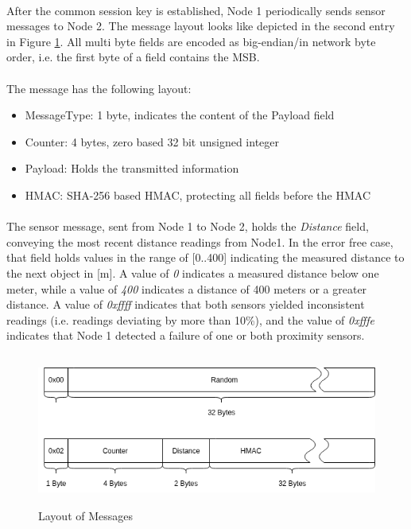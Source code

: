 \paragraph{} After the common session key is established, Node 1 periodically sends sensor messages to Node 2. The message layout looks like depicted in the second entry in Figure \ref{fig:msg}. All multi byte fields are encoded as big-endian/in network byte order, i.e. the first byte of a field contains the MSB.

\paragraph{} The message has the following layout:
\begin{itemize}
	\item MessageType: 1 byte, indicates the content of the Payload field
	\item Counter: 4 bytes, zero based 32 bit unsigned integer
	\item Payload: Holds the transmitted information
	\item HMAC: SHA-256 based HMAC, protecting all fields before the HMAC
\end{itemize}

\paragraph{} The sensor message, sent from Node 1 to Node 2, holds the \emph{Distance} field, conveying the most recent distance readings from Node1. In the error free case, that field holds values in the range of [0..400] indicating the measured distance to the next object in [m]. A value of \emph{0} indicates a measured distance below one meter, while a value of \emph{400} indicates a distance of 400 meters or a greater distance. A value of \emph{0xffff} indicates that both sensors yielded inconsistent readings (i.e. readings deviating by more than 10\%), and the value of \emph{0xfffe} indicates that Node 1 detected a failure of one or both proximity sensors.

\begin{figure}[h]
	\includegraphics[height=50mm]{images/MessageLayout.png}
	\centering
	\caption{Layout of Messages}
	\label{fig:msg}
\end{figure}
